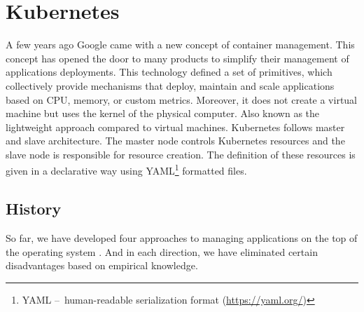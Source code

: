 \section{Kubernetes}
\label{01:sec:title}

A few years ago Google came with a new concept of container management. This concept has opened the door to many products to simplify their management of applications deployments. This technology defined a set of primitives, which collectively provide mechanisms that deploy, maintain and scale applications based on CPU, memory, or custom metrics. Moreover, it does not create a virtual machine but uses the kernel of the physical computer. Also known as the lightweight approach compared to virtual machines. Kubernetes follows master and slave architecture. The master node controls Kubernetes resources and the slave node is responsible for resource creation. The definition of these resources is given in a declarative way using YAML\footnote{YAML 
\---\ human-readable serialization format (\url{https://yaml.org/})} formatted files.

\subsection{History}
\label{fig:history}

So far, we have developed four approaches to managing applications on the top of the operating system \cite{history}. And in each direction, we have eliminated certain disadvantages based on empirical knowledge. 

